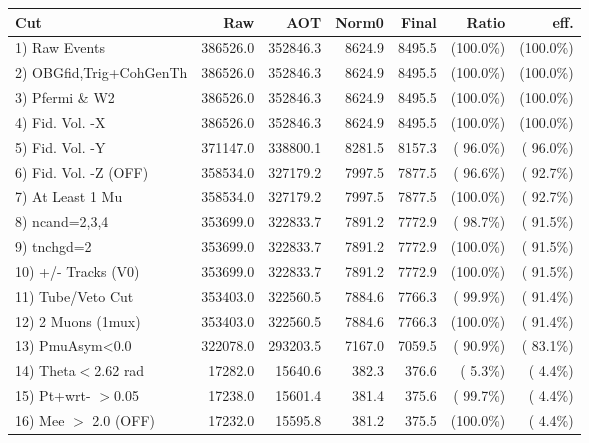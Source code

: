  \begin{table}[h!]\centering
 \begin{tabular}{||l||r|r|r|r|r|r||}
 \hline
 \hline
 Cut & Raw & AOT & Norm0 & Final & Ratio & eff.       \\
 \hline
  1) Raw Events           &     386526.0 &     352846.3 &       8624.9 &       8495.5 & (100.0\%) & (100.0\%) \\
  2) OBGfid,Trig+CohGenTh &     386526.0 &     352846.3 &       8624.9 &       8495.5 & (100.0\%) & (100.0\%) \\
  3) Pfermi \& W2         &     386526.0 &     352846.3 &       8624.9 &       8495.5 & (100.0\%) & (100.0\%) \\
  4) Fid. Vol. -X         &     386526.0 &     352846.3 &       8624.9 &       8495.5 & (100.0\%) & (100.0\%) \\
  5) Fid. Vol. -Y         &     371147.0 &     338800.1 &       8281.5 &       8157.3 & ( 96.0\%) & ( 96.0\%) \\
  6) Fid. Vol. -Z (OFF)   &     358534.0 &     327179.2 &       7997.5 &       7877.5 & ( 96.6\%) & ( 92.7\%) \\
  7) At Least 1 Mu        &     358534.0 &     327179.2 &       7997.5 &       7877.5 & (100.0\%) & ( 92.7\%) \\
  8) ncand=2,3,4          &     353699.0 &     322833.7 &       7891.2 &       7772.9 & ( 98.7\%) & ( 91.5\%) \\
  9) tnchgd=2             &     353699.0 &     322833.7 &       7891.2 &       7772.9 & (100.0\%) & ( 91.5\%) \\
 10) +/- Tracks (V0)      &     353699.0 &     322833.7 &       7891.2 &       7772.9 & (100.0\%) & ( 91.5\%) \\
 11) Tube/Veto Cut        &     353403.0 &     322560.5 &       7884.6 &       7766.3 & ( 99.9\%) & ( 91.4\%) \\
 12) 2 Muons (1mux)       &     353403.0 &     322560.5 &       7884.6 &       7766.3 & (100.0\%) & ( 91.4\%) \\
 13) PmuAsym<0.0          &     322078.0 &     293203.5 &       7167.0 &       7059.5 & ( 90.9\%) & ( 83.1\%) \\
 14) Theta$<$2.62 rad     &      17282.0 &      15640.6 &        382.3 &        376.6 & (  5.3\%) & (  4.4\%) \\
 15) Pt+wrt- $>$0.05      &      17238.0 &      15601.4 &        381.4 &        375.6 & ( 99.7\%) & (  4.4\%) \\
 16) Mee $>$ 2.0  (OFF)   &      17232.0 &      15595.8 &        381.2 &        375.5 & (100.0\%) & (  4.4\%) \\

\end{tabular}
\end{table}
